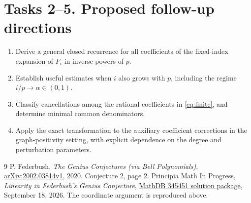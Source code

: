 \documentclass[11pt]{article}
\begin{document}
\section*{Tasks 2--5. Proposed follow-up directions}
\begin{enumerate}[label=\textbf{Task \arabic*.},start=2,leftmargin=*,itemsep=2pt,topsep=4pt]
\item Derive a general closed recurrence for all coefficients of the
fixed-index expansion of $F_i$ in inverse powers of $p$.
\item Establish useful estimates when $i$ also grows with $p$, including
the regime $i/p\to\alpha\in(0,1)$.
\item Classify cancellations among the rational coefficients in
\eqref{eq:finite}, and determine minimal common denominators.
\item Apply the exact transformation to the auxiliary coefficient
corrections in the graph-positivity setting, with explicit dependence
on the degree and perturbation parameters.
\end{enumerate}
\begin{thebibliography}{9}
 P. Federbush, \emph{The Genius Conjectures (via Bell
Polynomials)}, \href{https://arxiv.org/abs/2002.03814v1}{arXiv:2002.03814v1},
2020. Conjecture 2, page 2.
 Principia Math In Progress,
\emph{Linearity in Federbush's Genius Conjecture},
\href{https://github.com/antoshashakov/Principia-Math-In-Progress/tree/mathdb-results/mathdb-open-problems/problems/345451}{MathDB 345451 solution package},
September 18, 2026. The coordinate argument is reproduced above.
\end{thebibliography}
\end{document}
